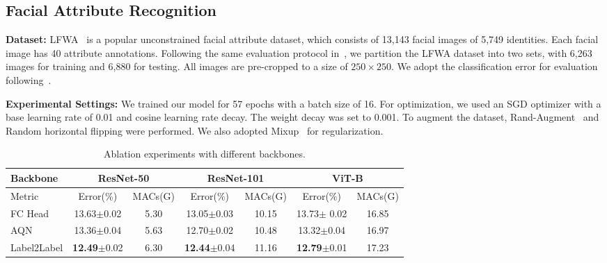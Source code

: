 \documentclass[runningheads]{llncs}
\begin{document}
\subsection{Facial Attribute Recognition}
\textbf{Dataset:} LFWA~\cite{liu2015deep}
is a popular unconstrained facial attribute dataset, which
consists of 13,143 facial images of 5,749 identities. Each facial image has 40 attribute annotations. Following the same evaluation protocol in~\cite{liu2015deep,cao2018partially,hand2017attributes}, we partition the LFWA dataset into two sets, with 6,263 images for training and 6,880 for testing. All images are pre-cropped to a size of $250 \times 250$. We adopt the classification error for evaluation following~\cite{cao2018partially,shu2021learning}. 

\textbf{Experimental Settings:} We trained our model for 57 epochs with a batch size of 16. For optimization, we used an SGD optimizer with a base learning rate of 0.01 and cosine learning rate decay. The weight decay was set to 0.001. To augment the dataset, Rand-Augment~\cite{Cubuk2020RandAugment} and Random horizontal flipping were performed. We also adopted Mixup~\cite{zhang2017mixup} for regularization.




\begin{table}[t]
  \caption{Ablation experiments with different backbones.}
  \label{table:ablation:back}
  \centering
  \begin{tabular}{lcccccc}
  \toprule
  Backbone & \multicolumn{2}{c}{ResNet-50}& \multicolumn{2}{c}{ResNet-101}  & \multicolumn{2}{c}{ViT-B} \\
  \midrule
  Metric & Error(\%) & MACs(G) & Error(\%) & MACs(G) & Error(\%) & MACs(G) \\ 
  \midrule
  FC Head & 13.63$\pm$0.02 & 5.30 & 13.05$\pm$0.03 & 10.15 & 13.73$\pm$ 0.02& 16.85  \\
  AQN & 13.36$\pm$0.04 & 5.63 & 12.70$\pm$0.02 & 10.48 & 13.32$\pm$0.04 & 16.97 \\
  Label2Label & \textbf{12.49}$\pm$0.02& 6.30 & \textbf{12.44}$\pm$0.04 & 11.16& \textbf{12.79}$\pm$0.01 & 17.23\\
  \bottomrule
  \end{tabular}
\end{table}
\end{document}
